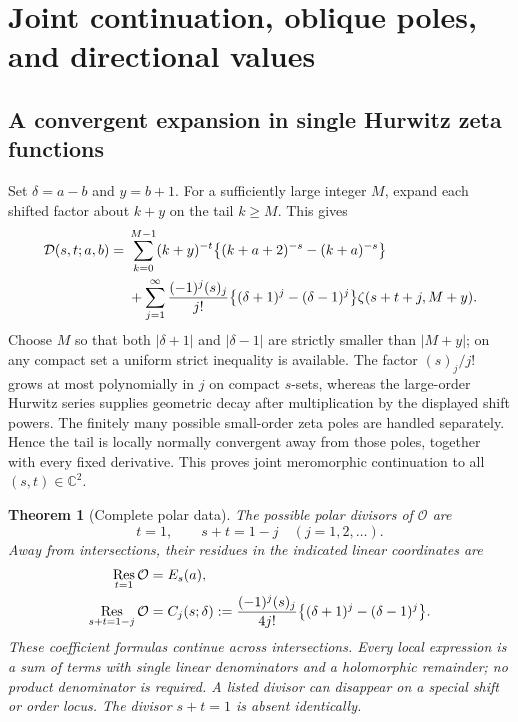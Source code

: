\documentclass[11pt,a4paper]{article}
\numberwithin{equation}{section}
\newtheorem{theorem}{Theorem}[section]
\theoremstyle{definition}
\theoremstyle{remark}
\DeclareMathOperator{\Res}{Res}
\newcommand{\C}{\mathbb C}
\newcommand{\Ord}{\mathcal O}
\newcommand{\Def}{\mathcal D}
\begin{document}
\section{Joint continuation, oblique poles, and directional values}
\label{sec:continuation}

\subsection{A convergent expansion in single Hurwitz zeta functions}

Set $\delta=a-b$ and $y=b+1$. For a sufficiently large integer $M$,
expand each shifted factor about $k+y$ on the tail $k\ge M$.
This gives
\begin{align}\label{eq:hurwitz-expansion}
 \Def(s,t;a,b)={}&
 \sum_{k=0}^{M-1}(k+y)^{-t}
       \bigl\{(k+a+2)^{-s}-(k+a)^{-s}\bigr\}\notag\\
 &+\sum_{j=1}^{\infty}\frac{(-1)^j(s)_j}{j!}
      \bigl\{(\delta+1)^j-(\delta-1)^j\bigr\}
           \zeta(s+t+j,M+y).
\end{align}
Choose $M$ so that both $|\delta+1|$ and $|\delta-1|$ are
strictly smaller than $|M+y|$; on any compact set a uniform strict
inequality is available. The factor $(s)_j/j!$ grows at most
polynomially in $j$ on compact $s$-sets, whereas the large-order
Hurwitz series supplies geometric decay after multiplication by
the displayed shift powers. The finitely many possible small-order
zeta poles are handled separately. Hence the tail is locally normally
convergent away from those poles, together with every fixed derivative.
This proves joint meromorphic continuation to all $(s,t)\in\C^2$.

\begin{theorem}[Complete polar data]\label{thm:poles}
The possible polar divisors of $\Ord$ are
\begin{equation}\label{eq:polar-divisors}
 t=1,\qquad s+t=1-j\quad(j=1,2,\ldots).
\end{equation}
Away from intersections, their residues in the indicated linear
coordinates are
\begin{align}\label{eq:polar-coefficients}
 \Res_{t=1}\Ord&=E_s(a),\notag\\
 \Res_{s+t=1-j}\Ord&=
 C_j(s;\delta):=\frac{(-1)^j(s)_j}{4j!}
              \bigl\{(\delta+1)^j-(\delta-1)^j\bigr\}.
\end{align}
These coefficient formulas continue across intersections. Every local
expression is a sum of terms with single linear denominators and a
holomorphic remainder; no product denominator is required. A listed
divisor can disappear on a special shift or order locus. The divisor
$s+t=1$ is absent identically.
\end{theorem}
\end{document}
